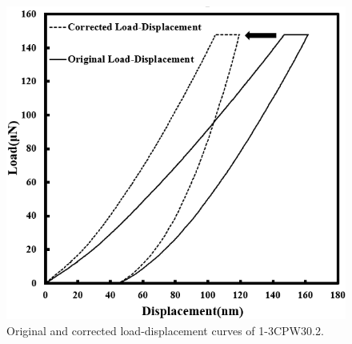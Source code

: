 \documentclass[review]{elsarticle}
\begin{document}
\begin{figure}[hb]
  \centering
  \includegraphics[scale=0.7]{LoadDispNano}
  \captionsetup{justification=centering}
  \caption[Close up of \textit{Hemidactylus} sp. ]
   {Original and corrected load-displacement curves of 1-3CPW30.2.}
  \label{fig:LoadDispNano}
\end{figure}
\end{document}
